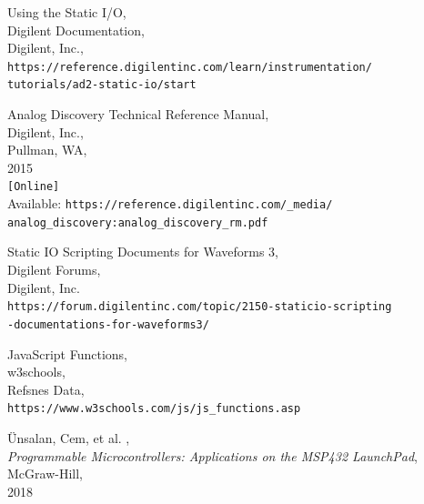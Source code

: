 \documentclass[12pt]{article}
\begin{document}
\begin{thebibliography}{9}

  Using the Static I/O, \\
  Digilent Documentation, \\
  Digilent, Inc., \\
  \verb!https://reference.digilentinc.com/learn/instrumentation/! \\
  \verb!tutorials/ad2-static-io/start!
  
 Analog Discovery Technical Reference Manual, \\
 Digilent, Inc., \\
 Pullman, WA, \\
 2015 \\
 \verb![Online]! \\
 Available: \verb!https://reference.digilentinc.com/_media/! \\
 \verb!analog_discovery:analog_discovery_rm.pdf!
 
 Static IO Scripting Documents for Waveforms 3, \\
 Digilent Forums, \\
 Digilent, Inc. \\
 \verb!https://forum.digilentinc.com/topic/2150-staticio-scripting! \\
 \verb!-documentations-for-waveforms3/!
 
 JavaScript Functions, \\
 w3schools, \\ 
 Refsnes Data, \\
 \verb!https://www.w3schools.com/js/js_functions.asp!
 
 {\"U}nsalan, Cem, et al. , \\
 \textit{Programmable Microcontrollers: Applications on the MSP432 LaunchPad}, \\
 McGraw-Hill, \\
 2018
 
\end{thebibliography}
\end{document}
